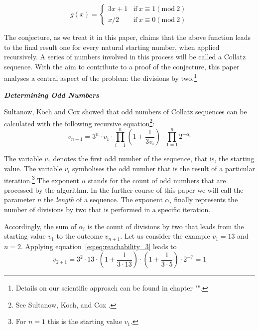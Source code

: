 \documentclass{SciPress_2015}
\renewcommand{\subsection}[1]{\textit{\textbf{#1}}}
\begin{document}
\begin{equation}
\label{eq:func_collatz}
g(x)=
\begin{cases}
3x+1	&	\text{if}\ x\equiv 1(\textrm{mod}\ 2)\\
x/2		&	\text{if}\ x\equiv 0(\textrm{mod}\ 2)
\end{cases}
\end{equation}

The conjecture, as we treat it in this paper, claims that the above function leads to the final result one for every natural starting number, when applied recursively. A series of numbers involved in this process will be called a Collatz sequence. With the aim to contribute to a proof of the conjecture, this paper analyses a central aspect of the problem: the divisions by two.\footnote{Details on our scientific approach can be found in chapter "".}

\vspace{1em}\noindent
\subsection{Determining Odd Numbers}
\par\noindent
Sultanow, Koch and Cox showed that odd numbers of Collatz sequences can be calculated with the following recursive equation\footnote{See Sultanow, Koch, and Cox \cite[p.~10]{Ref_Sultanow_Koch_Cox_2020}.}:
\begin{equation}
\label{eq:reachability_3}
v_{n+1}=3^n\cdot v_1\cdot\prod_{i=1}^{n}\left(1+\frac{1}{3v_{i}}\right)\cdot\prod_{1=1}^{n}2^{-\alpha_i}
\end{equation}

The variable $v_1$ denotes the first odd number of the sequence, that is, the starting value. The variable $v_i$ symbolises the odd number that is the result of a particular iteration.\footnote{For $n=1$ this is the starting value $v_1$.} The exponent $n$ stands for the count of odd numbers that are processed by the algorithm. In the further course of this paper we will call the parameter $n$ the \textit{length} of a sequence. The exponent $\alpha_i$ finally represents the number of divisions by two that is performed in a specific iteration.

\newpage
\par\noindent
Accordingly, the sum of $\alpha_i$ is the count of divisions by two that leads from the starting value $v_1$  to the outcome $v_{n+1}$. Let us consider the example $v_1=13$ and $n=2$. Applying equation~\ref{eq:eq:reachability_3} leads to
\[
v_{2+1}=3^2\cdot 13\cdot\left(1+\frac{1}{3\cdot13}\right)\cdot\left(1+\frac{1}{3\cdot5}\right)\cdot2^{-7}=1
\]
\end{document}
